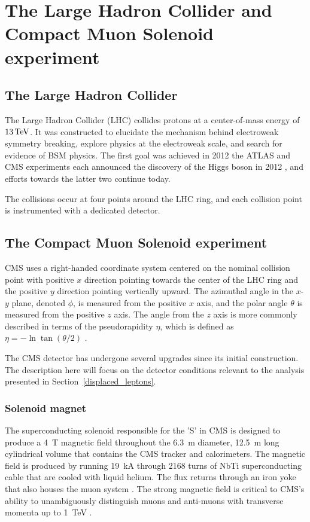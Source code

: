 \chapter{The Large Hadron Collider and Compact Muon Solenoid experiment}
\label{lhc_and_cms}

\section{The Large Hadron Collider}
The Large Hadron Collider (LHC) collides protons at a center-of-mass energy of $13\,\text{Te\hspace{-.08em}V}$. It was constructed to elucidate the mechanism behind electroweak symmetry breaking, explore physics at the electroweak scale, and search for evidence of BSM physics. The first goal was achieved in 2012 the ATLAS and CMS experiments each announced the discovery of the Higgs boson in 2012 \cite{cms_higgs, atlas_higgs}, and efforts towards the latter two continue today.

The collisions occur at four points around the LHC ring, and each collision point is instrumented with a dedicated detector.

\section{The Compact Muon Solenoid experiment}


CMS uses a right-handed coordinate system centered on the nominal collision point with positive $x$ direction pointing towards the center of the LHC ring and the positive $y$ direction pointing vertically upward. The azimuthal angle in the $x$-$y$ plane, denoted $\phi$, is measured from the positive $x$ axis, and the polar angle $\theta$ is measured from the positive $z$ axis. The angle from the $z$ axis is more commonly described in terms of the pseudorapidity $\eta$, which is defined as $\eta=-\ln\tan(\theta/2)$ \cite{cms_tdr_v1}.

The CMS detector has undergone several upgrades since its initial construction. The description here will focus on the detector conditions relevant to the analysis presented in Section~\ref{displaced_leptons}.

\subsection{Solenoid magnet}
The superconducting solenoid responsible for the 'S' in CMS is designed to produce a \SI{4}{\tesla} magnetic field throughout the \SI{6.3}{\metre} diameter, \SI{12.5}{\metre} long cylindrical volume  that contains the CMS tracker and calorimeters. The magnetic field is produced by running \SI{19}{\kilo\ampere} through 2168 turns of NbTi superconducting cable that are cooled with liquid helium. The flux returns through an iron yoke that also houses the muon system \cite{cms_experiment}. The strong magnetic field is critical to CMS's ability to unambiguously distinguish muons and anti-muons with transverse momenta up to \SI{1}{\TeV} \cite{cms_tdr_v1}.

